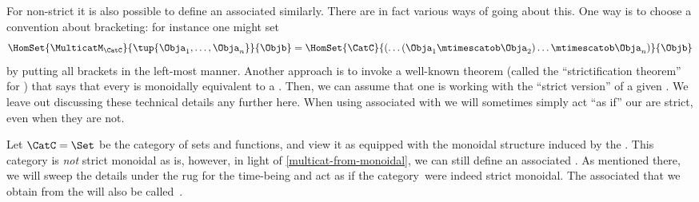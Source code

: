 


\begin{remark}
    \label{multicat-from-monoidal}
    For non-strict  it is also possible to define an associated  similarly.
    There are in fact various ways of going about this.
    One way is to choose a convention about bracketing: for instance one might set
    \begin{equation}
        \HomSet{\MulticatM_\CatC}{\tup{\Obja_1,\ldots,\Obja_n}}{\Objb}=\HomSet{\CatC}{ ( \dots (\Obja_1 \mtimescatob \Obja_2) \ldots \mtimescatob \Obja_n)}{\Objb}
    \end{equation}
    by putting all brackets in the left-most manner.
    Another approach is to invoke a well-known theorem (called the ``strictification theorem'' for ) that says that every  is monoidally equivalent to a .
    Then, we can assume that one is working with the ``strict version'' of a given .
    We leave out discussing these technical details any further here.
    When using  associated with  we will sometimes simply act ``as if'' our  are strict, even when they are not.
\end{remark}

\begin{example}
    Let $\CatC = \Set$ be the category of sets and functions, and view it as equipped with the monoidal structure induced by the .
    This category is \emph{not} strict monoidal as is, however, in light of \cref{multicat-from-monoidal}, we can still define an associated .
    As mentioned there, we will sweep the details under the rug for the time-being and act as if the category~\Set were indeed strict monoidal.
    The associated  that we obtain from the  \Set will also be called~\Set.
\end{example}

